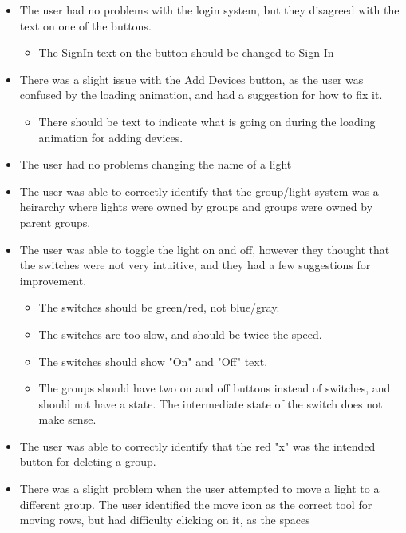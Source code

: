 \documentclass[oneside,openright]{book}
\begin{document}
\begin{itemize}
    \item The user had no problems with the login system, but they disagreed
        with the text on one of the buttons.
        \begin{itemize}
            \item The SignIn text on the button should be changed to Sign In
        \end{itemize}
    \item There was a slight issue with the Add Devices button, as the user was
        confused by the loading animation, and had a suggestion for how to fix
        it.
        \begin{itemize}
            \item There should be text to indicate what is going on during the
                loading animation for adding devices.
        \end{itemize}
    \item The user had no problems changing the name of a light
    \item The user was able to correctly identify that the group/light system
        was a heirarchy where lights were owned by groups and groups were owned
        by parent groups.
    \item The user was able to toggle the light on and off, however they
        thought that the switches were not very intuitive, and they had a few
        suggestions for improvement.
        \begin{itemize}
            \item The switches should be green/red, not blue/gray.
            \item The switches are too slow, and should be twice the speed.
            \item The switches should show "On" and "Off" text.
            \item The groups should have two on and off buttons instead of
                switches, and should not have a state. The intermediate state
                of the switch does not make sense.
        \end{itemize}
    \item The user was able to correctly identify that the red "x" was the
        intended button for deleting a group.
    \item There was a slight problem when the user attempted to move a light to
        a different group. The user identified the move icon as the correct
        tool for moving rows, but had difficulty clicking on it, as the spaces

\end{itemize}
\end{document}
